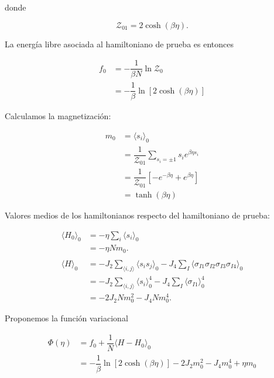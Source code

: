 \documentclass[10pt]{article}
\begin{document}
donde 

\begin{equation}
\mathcal{Z}_{01} = 2 \cosh\left(\beta \eta\right).
\end{equation}

La energ\'ia libre asociada al hamiltoniano de prueba es entonces

\begin{align}
f_0 &= -\dfrac{1}{\beta N} \ln \mathcal{Z}_0 \nonumber \\
&= -\dfrac{1}{\beta} \ln \left[ 2 \cosh\left(\beta \eta\right) \right]
\end{align}

Calculamos la magnetizaci\'on:

\begin{align} \label{eq:BC_m0}
m_0 &= \langle s_i \rangle_0 \nonumber \\
&= \dfrac{1}{\mathcal{Z}_{01}} \sum_{s_i=\pm1} s_i e^{\beta \eta s_i} \nonumber \\
&= \dfrac{1}{\mathcal{Z}_{01}} \left[-e^{-\beta \eta} + e^{\beta \eta} \right] \nonumber \\
&= \tanh\left( \beta \eta \right)
\end{align}


Valores medios de los hamiltonianos respecto del hamiltoniano de prueba:

\begin{align}
\langle H_0 \rangle_0 &= -\eta \sum_i \langle s_i \rangle_0  \nonumber \\
&= -\eta N m_0. \\
\nonumber \\
\langle H \rangle_0 &= -J_2 \sum_{\langle i,j\rangle} \langle s_i s_j \rangle_0 - J_4 \sum_I \langle\sigma_{I1}\sigma_{I2}\sigma_{I3}\sigma_{I4} \rangle_0 \nonumber \\
&= -J_2 \sum_{\langle i,j\rangle} \langle s_i\rangle_0^4 - J_4 \sum_I \langle\sigma_{I1}\rangle_0^4  \nonumber \\
&= -2 J_2 N m_0^2 - J_4 N m_0^4 .
\end{align}

Proponemos la funci\'on variacional 

\begin{align} \label{eq:BC_Phi}
\Phi(\eta) &= f_0 + \dfrac{1}{N} \langle H - H_0 \rangle_0 \nonumber \\
&= -\dfrac{1}{\beta} \ln \left[2 \cosh\left(\beta \eta\right) \right] -2 J_2 m_0^2 - J_4 m_0^4 + \eta m_0
\end{align}
\end{document}
